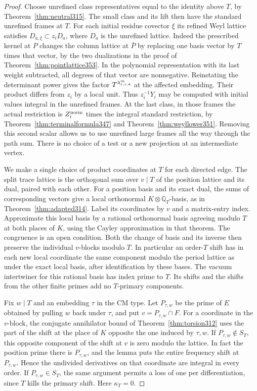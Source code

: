 \documentclass[a4paper,11pt]{article}
\theoremstyle{definition}
\theoremstyle{remark}
\numberwithin{equation}{section}
\begin{document}
\begin{proof}
Choose unrefined class representatives equal to the identity
above \(T\), by Theorem~\ref{thm:neutral315}. The small class
and its lift then have the standard unrefined frames at \(T\).
For each initial residue covector \(\xi\) its refined Weyl
lattice satisfies \(D_{a,\xi}\subset z_iD_a\), where \(D_a\)
is the unrefined lattice. Indeed the prescribed kernel at \(P\)
changes the column lattice at \(\bar P\) by replacing one basis
vector by \(T\) times that vector, by the two dualizations
in the proof of Theorem~\ref{thm:pointlattice353}.
In the polynomial representation with its last weight
subtracted, all degrees of that vector are nonnegative.
Reinstating the determinant power gives the factor
\(T^{\lambda^{\rm in}_{i,\tau,k}}\) at the affected embedding.
Their product differs from \(z_i\) by a local unit.
Thus \(z_i^{-1}Y_i\) may be computed with initial values integral
in the unrefined frames. At the last class, in those frames
the actual restriction is \(Z_i^{\rm norm}\) times the integral
standard restriction, by Theorem~\ref{thm:terminalformula347}
and Theorem~\ref{thm:weyllower351}. Removing this second scalar
allows us to use unrefined large frames all the way through
the path sum. There is no choice of a test or a new projection
at an intermediate vertex.

We make a single choice of product coordinates at \(T\) for
each directed edge. The split trace lattice is the orthogonal
sum over \(v\mid T\) of the position lattice and its dual,
paired with each other. For a position basis and its exact
dual, the sums of corresponding vectors give a local
orthonormal \(K\otimes\mathbb Q_T\)-basis, as in
Theorem~\ref{thm:adapted314}. Label its coordinates by \(v\)
and a matrix-entry index. Approximate this local basis by a
rational orthonormal basis agreeing modulo \(T\) at both
places of \(K\), using the Cayley approximation in that theorem.
The congruence is an open condition. Both the change of basis
and its inverse then preserve the individual \(v\)-blocks
modulo \(T\). In particular an order-\(T\) shift has in each
new local coordinate the same component modulo the period
lattice as under the exact local basis, after identification
by these bases. The vacuum intertwiner for this rational basis
has index prime to \(T\). Its shifts and the shifts from the
other finite primes add no \(T\)-primary components.

Fix \(w\mid T\) and an embedding \(\tau\) in the CM type.
Let \(P_{\tau,w}\) be the prime of \(E\) obtained by pulling
\(w\) back under \(\tau\), and put \(v=P_{\tau,w}\cap F\).
For a coordinate in the \(v\)-block, the conjugate annihilator
bound of Theorem~\ref{thm:torsion312} uses the part of the
shift at the place of \(K\) opposite the one induced by \(\tau,w\).
If \(P_{\tau,w}\notin S_T\), this opposite component of the
shift at \(v\) is zero modulo the lattice. In fact the position
prime there is \(\overline{P_{\tau,w}}\), and the lemma puts
the entire frequency shift at \(P_{\tau,w}\). Hence the
undivided derivatives on that coordinate are integral in
every order. If \(P_{\tau,w}\in S_T\), the same argument permits
a loss of one per differentiation, since \(T\) kills the
primary shift. Here \(\kappa_T=0\).


\end{proof}
\end{document}
